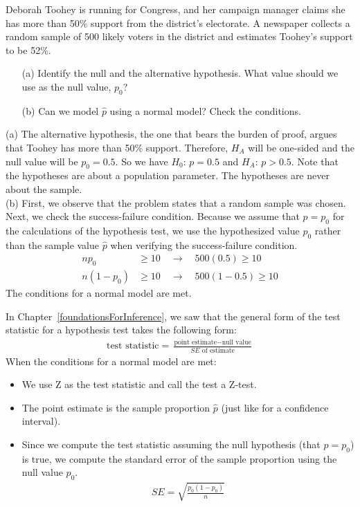 \begin{examplewrap}
\begin{nexample}{Deborah Toohey is running for Congress, and her campaign manager claims she has more than 50\% support from the district's electorate. A newspaper collects a random sample of 500 likely voters in the district and estimates Toohey's support to be 52\%.
\begin{itemize}
\item[(a)] Identify the null and the alternative hypothesis. What value should we use as the null value, $p_{0}$?
\item[(b)] Can we model $\hat{p}$ using a normal model? Check the conditions.
\end{itemize}}
\label{TooheyTestNameAndConditionExample}
(a) The alternative hypothesis, the one that bears the burden of proof, argues that Toohey has more than 50\% support. Therefore, $H_A$ will be one-sided and the null value will be $p_0 = 0.5$. So we have $H_0$: $p = 0.5$ and $H_A$: $p > 0.5$. Note that the hypotheses are about a population parameter.  The hypotheses are never about the sample.\\[2mm]
(b) First, we observe that the problem states that a random sample was chosen.  Next, we check the success-failure condition.    Because we assume that $p = p_0$ for the calculations of the hypothesis test, we use the hypothesized value $p_0$ rather than the sample value $\hat{p}$ when verifying the success-failure condition.  
\begin{align*}
np_0 &\geq 10 \quad \rightarrow \quad 500(0.5) \geq 10 \\
n(1-p_0) &\geq 10 \quad \rightarrow \quad 500(1-0.5) \geq 10
\end{align*}
The conditions for a normal model are met.
\end{nexample}
\end{examplewrap}


In Chapter~\ref{foundationsForInference}, we saw that the general form of the test statistic for a hypothesis test takes the following form:
\begin{align*}
\text{test statistic} = \frac{\text{point estimate} - \text{null value}}{SE \text{ of estimate}}
\end{align*}
When the conditions for a normal model are met:
\begin{itemize}
\item We use Z as the test statistic and call the test a Z-test.
\item The point estimate is the sample proportion $\hat{p}$ (just like for a confidence interval).
\item Since we compute the test statistic assuming the null hypothesis (that $p = p_0$) is true, we compute the standard error of the sample proportion using the null value $p_0$.
\begin{align*}
SE = \sqrt{\frac{p_0(1-p_0)}{n}}
\end{align*}
\end{itemize}


